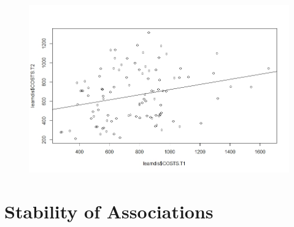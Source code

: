 \documentclass[]{article}
\begin{document}
\begin{figure}[H]
\centering
\includegraphics[width=12cm]{RStudio/jpeg/Reg_COST.jpeg}
\end{figure}

\newpage
\section{Stability of Associations}
\end{document}
